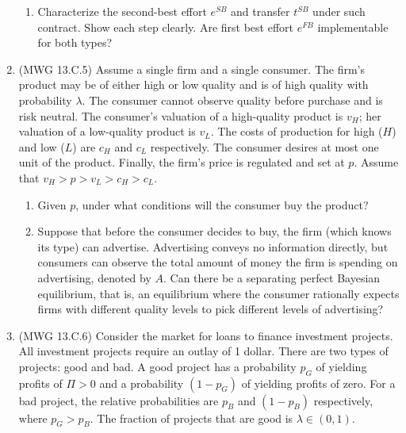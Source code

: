 \documentclass[12pt]{article}
\begin{document}
\begin{enumerate}
\begin{enumerate}
		\item Characterize the second-best effort $e^{SB}$ and transfer $t^{SB}$ under such contract. Show each step clearly. Are first best effort $e^{FB}$ implementable for both types?
	\end{enumerate}
	\item (MWG 13.C.5) Assume a single firm and a single consumer. The firm's product may be of either high or low quality and is of high quality with probability $\lambda$. The consumer cannot observe quality before purchase and is risk neutral. The consumer's valuation of a high-quality product is $v_H$; her valuation of a low-quality product is $v_L$. The costs of production for high ($H$) and low ($L$) are $c_H$ and $c_L$ respectively. The consumer desires at most one unit of the product. Finally, the firm's price is regulated and set at $p$. Assume that $v_H > p > v_L > c_H > c_L$.
	\begin{enumerate}
		\item Given $p$, under what conditions will the consumer buy the product?
		\item Suppose that before the consumer decides to buy, the firm (which knows its type) can advertise. Advertising conveys no information directly, but consumers can observe the total amount of money the firm is spending on advertising, denoted by $A$. Can there be a separating perfect Bayesian equilibrium, that is, an equilibrium where the consumer rationally expects firms with different quality levels to pick different levels of advertising?
	\end{enumerate}
	\item (MWG 13.C.6) Consider the market for loans to finance investment projects. All investment projects require an outlay of 1 dollar. There are two types of projects: good and bad. A good project has a probability $p_G$ of yielding profits of $\Pi > 0$ and a probability $(1-p_G)$ of yielding profits of zero. For a bad project, the relative probabilities are $p_B$ and $(1-p_B)$ respectively, where $p_G > p_B$. The fraction of projects that are good is $\lambda \in (0,1)$. 
	

\end{enumerate}
\end{document}
